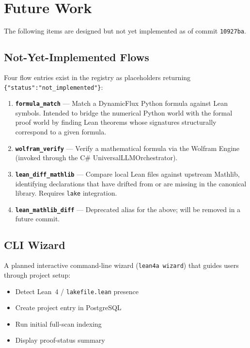 
\section{Future Work}
\label{sec:future-work}

The following items are designed but not yet implemented as of commit
\texttt{10927ba}.

\subsection{Not-Yet-Implemented Flows}

Four flow entries exist in the registry as placeholders returning
\texttt{\{"status":"not\_implemented"\}}:

\begin{enumerate}
  \item \textbf{\texttt{formula\_match}} — Match a DynamicFlux Python formula
        against Lean symbols.  Intended to bridge the numerical Python world
        with the formal proof world by finding Lean theorems whose signatures
        structurally correspond to a given formula.
  \item \textbf{\texttt{wolfram\_verify}} — Verify a mathematical formula via
        the Wolfram Engine (invoked through the C\# UniversalLLMOrchestrator).
  \item \textbf{\texttt{lean\_diff\_mathlib}} — Compare local Lean files
        against upstream Mathlib, identifying declarations that have drifted
        from or are missing in the canonical library.  Requires
        \texttt{lake} integration.
  \item \textbf{\texttt{lean\_mathlib\_diff}} — Deprecated alias for the above;
        will be removed in a future commit.
\end{enumerate}

\subsection{CLI Wizard}

A planned interactive command-line wizard (\texttt{lean4a wizard}) that guides
users through project setup:

\begin{itemize}
  \item Detect Lean~4 / \texttt{lakefile.lean} presence
  \item Create project entry in PostgreSQL
  \item Run initial full-scan indexing
  \item Display proof-status summary
\end{itemize}

